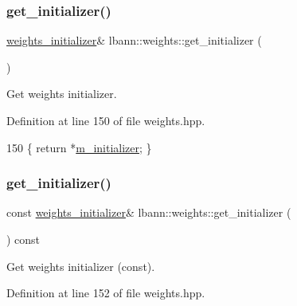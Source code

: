 \subsubsection{\texorpdfstring{get\+\_\+initializer()}{get\_initializer()}\hspace{0.1cm}{\footnotesize\ttfamily [1/2]}}
{\footnotesize\ttfamily \hyperlink{classlbann_1_1weights__initializer}{weights\+\_\+initializer}\& lbann\+::weights\+::get\+\_\+initializer (\begin{DoxyParamCaption}{ }\end{DoxyParamCaption})\hspace{0.3cm}{\ttfamily [inline]}}

Get weights initializer. 

Definition at line 150 of file weights.\+hpp.


\begin{DoxyCode}
150 \{ \textcolor{keywordflow}{return} *\hyperlink{classlbann_1_1weights_a3ddbcce8d543e975efeebdb43e82444c}{m\_initializer}; \}
\end{DoxyCode}
\mbox{\label{classlbann_1_1weights_aeaf4d47037d464922121223d4b0b6c33}} 
\subsubsection{\texorpdfstring{get\+\_\+initializer()}{get\_initializer()}\hspace{0.1cm}{\footnotesize\ttfamily [2/2]}}
{\footnotesize\ttfamily const \hyperlink{classlbann_1_1weights__initializer}{weights\+\_\+initializer}\& lbann\+::weights\+::get\+\_\+initializer (\begin{DoxyParamCaption}{ }\end{DoxyParamCaption}) const\hspace{0.3cm}{\ttfamily [inline]}}

Get weights initializer (const). 

Definition at line 152 of file weights.\+hpp.


